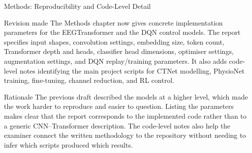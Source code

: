 \documentclass[UTF8,aspectratio=169,11pt]{ctexbeamer}
\begin{document}
\begin{frame}[t]{Methods: Reproducibility and Code-Level Detail}
\footnotesize

    \begin{block}{Revision made}
        The Methods chapter now gives concrete implementation parameters for the EEGTransformer and the DQN control models. The report specifies input shapes, convolution settings, embedding size, token count, Transformer depth and heads, classifier head dimensions, optimiser settings, augmentation settings, and DQN replay/training parameters. It also adds code-level notes identifying the main project scripts for CTNet modelling, PhysioNet training, fine-tuning, channel reduction, and RL control.
    \end{block}

    \vfill

    \begin{alertblock}{Rationale}
        The previous draft described the models at a higher level, which made the work harder to reproduce and easier to question. Listing the parameters makes clear that the report corresponds to the implemented code rather than to a generic CNN--Transformer description. The code-level notes also help the examiner connect the written methodology to the repository without needing to infer which scripts produced which results.
    \end{alertblock}

\end{frame}
\end{document}
